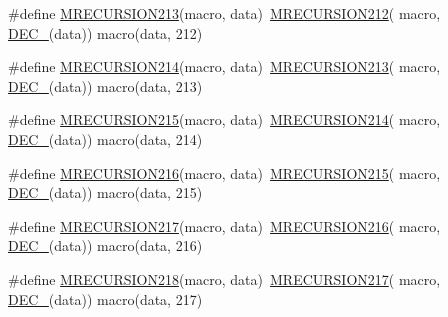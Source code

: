 \begin{DoxyCompactItemize}
\item 
\#define \mbox{\hyperlink{group__group__sam0__utils__mrecursion_ga6889e48b19ed9abc794256617f4b6758}{M\+R\+E\+C\+U\+R\+S\+I\+O\+N213}}(macro,  data)~\mbox{\hyperlink{group__group__sam0__utils__mrecursion_gad848cc0ac4bd174398a6421a1da308c7}{M\+R\+E\+C\+U\+R\+S\+I\+O\+N212}}(  macro, \mbox{\hyperlink{group__group__sam0__utils__mrecursion_ga1d23d683797679dca8c3512a54a5dcae}{D\+E\+C\+\_\+}}(data))   macro(data, 212)
\item 
\#define \mbox{\hyperlink{group__group__sam0__utils__mrecursion_gad5d21c13be81fdbaabdf6dad7968fbd2}{M\+R\+E\+C\+U\+R\+S\+I\+O\+N214}}(macro,  data)~\mbox{\hyperlink{group__group__sam0__utils__mrecursion_ga6889e48b19ed9abc794256617f4b6758}{M\+R\+E\+C\+U\+R\+S\+I\+O\+N213}}(  macro, \mbox{\hyperlink{group__group__sam0__utils__mrecursion_ga1d23d683797679dca8c3512a54a5dcae}{D\+E\+C\+\_\+}}(data))   macro(data, 213)
\item 
\#define \mbox{\hyperlink{group__group__sam0__utils__mrecursion_ga5e1d85eb398f85ae49997b1202f36a9a}{M\+R\+E\+C\+U\+R\+S\+I\+O\+N215}}(macro,  data)~\mbox{\hyperlink{group__group__sam0__utils__mrecursion_gad5d21c13be81fdbaabdf6dad7968fbd2}{M\+R\+E\+C\+U\+R\+S\+I\+O\+N214}}(  macro, \mbox{\hyperlink{group__group__sam0__utils__mrecursion_ga1d23d683797679dca8c3512a54a5dcae}{D\+E\+C\+\_\+}}(data))   macro(data, 214)
\item 
\#define \mbox{\hyperlink{group__group__sam0__utils__mrecursion_ga6d25603f9fa30627ed714c4853ec50a4}{M\+R\+E\+C\+U\+R\+S\+I\+O\+N216}}(macro,  data)~\mbox{\hyperlink{group__group__sam0__utils__mrecursion_ga5e1d85eb398f85ae49997b1202f36a9a}{M\+R\+E\+C\+U\+R\+S\+I\+O\+N215}}(  macro, \mbox{\hyperlink{group__group__sam0__utils__mrecursion_ga1d23d683797679dca8c3512a54a5dcae}{D\+E\+C\+\_\+}}(data))   macro(data, 215)
\item 
\#define \mbox{\hyperlink{group__group__sam0__utils__mrecursion_ga833c81184ac65b08f60d98bf30ff1cfb}{M\+R\+E\+C\+U\+R\+S\+I\+O\+N217}}(macro,  data)~\mbox{\hyperlink{group__group__sam0__utils__mrecursion_ga6d25603f9fa30627ed714c4853ec50a4}{M\+R\+E\+C\+U\+R\+S\+I\+O\+N216}}(  macro, \mbox{\hyperlink{group__group__sam0__utils__mrecursion_ga1d23d683797679dca8c3512a54a5dcae}{D\+E\+C\+\_\+}}(data))   macro(data, 216)
\item 
\#define \mbox{\hyperlink{group__group__sam0__utils__mrecursion_ga0cd77c09c29f7703306e2baa29d6e6c2}{M\+R\+E\+C\+U\+R\+S\+I\+O\+N218}}(macro,  data)~\mbox{\hyperlink{group__group__sam0__utils__mrecursion_ga833c81184ac65b08f60d98bf30ff1cfb}{M\+R\+E\+C\+U\+R\+S\+I\+O\+N217}}(  macro, \mbox{\hyperlink{group__group__sam0__utils__mrecursion_ga1d23d683797679dca8c3512a54a5dcae}{D\+E\+C\+\_\+}}(data))   macro(data, 217)

\end{DoxyCompactItemize}
